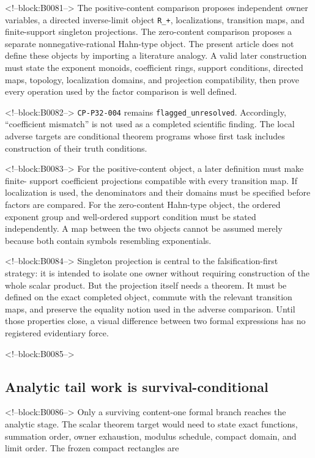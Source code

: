 \documentclass[11pt]{article}
\begin{document}
<!--block:B0081-->
The positive-content comparison proposes independent owner variables, a
directed inverse-limit object \texttt{R\_+}, localizations, transition
maps, and finite-support singleton projections. The zero-content
comparison proposes a separate nonnegative-rational Hahn-type object.
The present article does not define these objects by importing a literature
analogy. A valid later construction must state the exponent monoids,
coefficient rings, support conditions, directed maps, topology,
localization domains, and projection compatibility, then prove every
operation used by the factor comparison is well defined.

<!--block:B0082-->
\texttt{CP-P32-004} remains \texttt{flagged\_unresolved}. Accordingly,
``coefficient mismatch'' is not used as a completed scientific finding.
The local adverse targets are conditional theorem programs whose first
task includes construction of their truth conditions.

<!--block:B0083-->
For the positive-content object, a later definition must make finite-
support coefficient projections compatible with every transition map.
If localization is used, the denominators and their domains must be
specified before factors are compared. For the zero-content Hahn-type
object, the ordered exponent group and well-ordered support condition
must be stated independently. A map between the two objects cannot be
assumed merely because both contain symbols resembling exponentials.

<!--block:B0084-->
Singleton projection is central to the falsification-first strategy: it
is intended to isolate one owner without requiring construction of the
whole scalar product. But the projection itself needs a theorem. It
must be defined on the exact completed object, commute with the relevant
transition maps, and preserve the equality notion used in the adverse
comparison. Until those properties close, a visual difference between
two formal expressions has no registered evidentiary force.

<!--block:B0085-->
\hypertarget{46-analytic-tail-work-is-survival-conditional}{%
\subsection{Analytic tail work is
survival-conditional}\label{46-analytic-tail-work-is-survival-conditional}}

<!--block:B0086-->
Only a surviving content-one formal branch reaches the analytic stage.
The scalar theorem target would need to state exact functions, summation
order, owner exhaustion, modulus schedule, compact domain, and limit
order. The frozen compact rectangles are
\end{document}
